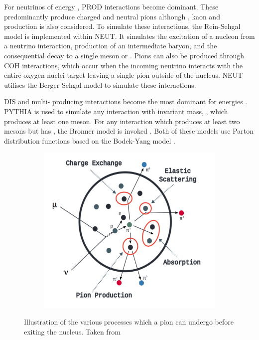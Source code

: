 For neutrinos of energy , PROD interactions become dominant. These predominantly produce charged and neutral pions although \quickmath{\gamma}, kaon and \quickmath{\eta} production is also considered. To simulate these interactions, the Rein-Sehgal \cite{Rein_Sehgal} model is implemented within NEUT. It simulates the excitation of a nucleon from a neutrino interaction, production of an intermediate baryon, and the consequential decay to a single meson or \quickmath{\gamma}. Pions can also be produced through COH interactions, which occur when the incoming neutrino interacts with the entire oxygen nuclei target leaving a single pion outside of the nucleus. NEUT utilises the Berger-Sehgal \cite{Berger_Sehgal_coh} model to simulate these interactions.

DIS and multi-\quickmath{\pi} producing interactions become the most dominant for energies . PYTHIA \cite{Sjstrand1994} is used to simulate any interaction with invariant mass, , which produces at least one meson. For any interaction which produces at least two mesons but has , the Bronner model is invoked \cite{Bronner2016}. Both of these models use Parton distribution functions based on the Bodek-Yang model \cite{Gl_ck_1998,10.48550/arxiv.1011.6592,10.48550/arxiv.1012.0261}. 

\begin{figure}[h]
  \begin{subfigure}[t]{0.8\textwidth}
    \includegraphics[width=\textwidth, trim={0mm 0mm 0mm 0mm}, clip,page=1]{Figures/Selections/FSIDiagram.pdf}
  \end{subfigure}
  \caption{Illustration of the various processes which a pion can undergo before exiting the nucleus. Taken from \cite{10.48550/arxiv.1602.05299}}
  \label{fig:Selection_FSIDiagram}
\end{figure}

